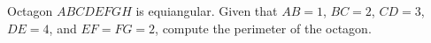 Octagon $ABCDEFGH$ is equiangular. Given that $AB=1$, $BC=2$, $CD=3$, $DE=4$, and $EF=FG=2$, compute the perimeter of the octagon.